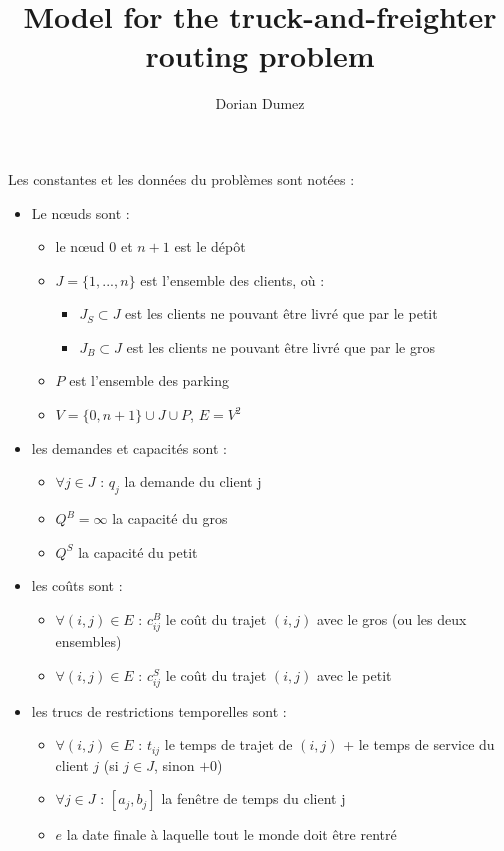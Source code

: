 \documentclass[12pt,a4paper,fleqn]{article}
\title{Model for the truck-and-freighter routing problem}
\author{Dorian Dumez}
\begin{document}
\maketitle

Les constantes et les données du problèmes sont notées :
\begin{itemize}
\item Le nœuds sont :
\begin{itemize}
\item le nœud 0 et $n+1$ est le dépôt
\item $J = \{1,...,n\}$ est l'ensemble des clients, où :
\begin{itemize}
\item $J_S \subset J$ est les clients ne pouvant être livré que par le petit
\item $J_B \subset J$ est les clients ne pouvant être livré que par le gros
\end{itemize}
\item $P$ est l'ensemble des parking
\item $V = \{0, n+1\} \cup J \cup P$, $E = V^2$
\end{itemize}
\item les demandes et capacités sont :
\begin{itemize}
\item $\forall j \in J \text{ : } q_j$ la demande du client j
\item $Q^B = \infty$ la capacité du gros
\item $Q^S$ la capacité du petit
\end{itemize}
\item les coûts sont :
\begin{itemize}
\item $\forall (i,j) \in E \text{ : } c^B_{ij}$ le coût du trajet $(i,j)$ avec le gros (ou les deux ensembles)
\item $\forall (i,j) \in E \text{ : } c^S_{ij}$ le coût du trajet $(i,j)$ avec le petit
\end{itemize} 
\item les trucs de restrictions temporelles sont :
\begin{itemize}
\item $\forall (i,j) \in E \text{ : } t_{ij}$ le temps de trajet de $(i,j)$ + le temps de service du client $j$ (si $j \in J$, sinon $+0$)
\item $\forall j \in J \text{ : } [a_j,b_j]$ la fenêtre de temps du client j
\item $e$ la date finale à laquelle tout le monde doit être rentré
\end{itemize}
\end{itemize}
\end{document}
